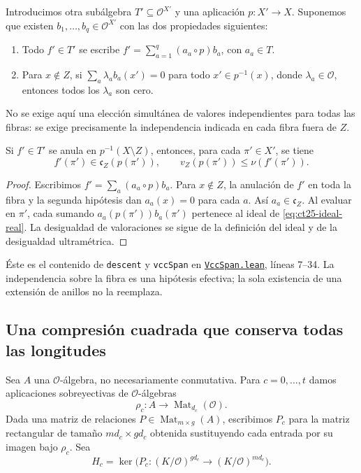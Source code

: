 Introducimos otra subálgebra $T'\subseteq\mathcal O^{X'}$ y una aplicación $p:X'\to X$. Suponemos que existen $b_1,\ldots,b_q\in\mathcal O^{X'}$ con las dos propiedades siguientes:
\begin{enumerate}
\item Todo $f'\in T'$ se escribe $f'=\sum_{a=1}^q(a_a\circ p)b_a$, con $a_a\in T$.
\item Para $x\notin Z$, si $\sum_a\lambda_ab_a(x')=0$ para todo $x'\in p^{-1}(x)$, donde $\lambda_a\in\mathcal O$, entonces todos los $\lambda_a$ son cero.
\end{enumerate}
No se exige aquí una elección simultánea de valores independientes para todas las fibras: se exige precisamente la independencia indicada en cada fibra fuera de $Z$.

\begin{lema}
\label{lem:ct25-descenso}
Si $f'\in T'$ se anula en $p^{-1}(X\setminus Z)$, entonces, para cada $\pi'\in X'$, se tiene
\[
 f'(\pi')\in\mathfrak c_Z(p(\pi')),
 \qquad v_Z(p(\pi'))\le\nu(f'(\pi')).
\]
\end{lema}
\begin{proof}
Escribimos $f'=\sum_a(a_a\circ p)b_a$. Para $x\notin Z$, la anulación de $f'$ en toda la fibra y la segunda hipótesis dan $a_a(x)=0$ para cada $a$. Así $a_a\in\mathfrak c_Z$. Al evaluar en $\pi'$, cada sumando $a_a(p(\pi'))b_a(\pi')$ pertenece al ideal de \eqref{eq:ct25-ideal-real}. La desigualdad de valoraciones se sigue de la definición del ideal y de la desigualdad ultramétrica.
\end{proof}

Éste es el contenido de \texttt{descent} y \texttt{vccSpan} en \href{https://github.com/CocoSgt/riemann-hypothesis-lean/blob/7cbf7a0c32fca1badf05931879a37c3f8a2b03b4/src/Formalism/CharacterColumnKernels/IdempotentNormalForms/VccSpan.lean}{\nolinkurl{VccSpan.lean}}, líneas 7--34. La independencia sobre la fibra es una hipótesis efectiva; la sola existencia de una extensión de anillos no la reemplaza.

\subsection{Una compresión cuadrada que conserva todas las longitudes}

Sea $A$ una $\mathcal O$-álgebra, no necesariamente conmutativa. Para $c=0,\ldots,t$ damos aplicaciones sobreyectivas de $\mathcal O$-álgebras
\[
 \rho_c:A\longrightarrow\operatorname{Mat}_{d_c}(\mathcal O).
\]
Dada una matriz de relaciones $P\in\operatorname{Mat}_{m\times g}(A)$, escribimos $P_c$ para la matriz rectangular de tamaño $md_c\times gd_c$ obtenida sustituyendo cada entrada por su imagen bajo $\rho_c$. Sea
\[
 H_c=\ker\bigl(P_c:(K/\mathcal O)^{gd_c}\longrightarrow(K/\mathcal O)^{md_c}\bigr).
\]

